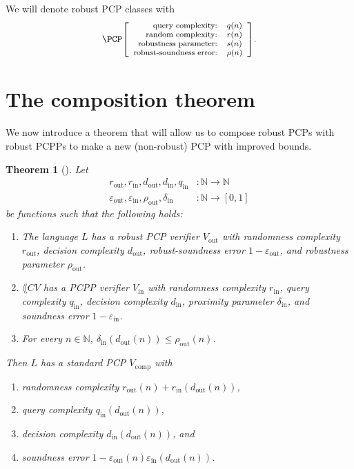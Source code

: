 \documentclass[english,12pt]{reedthesis}
\theoremstyle{plain}
\newtheorem{thm}{Theorem}[section]
\theoremstyle{definition}
\theoremstyle{remark}
\DeclareMathOperator{\out}{out}
\DeclareMathOperator{\oin}{in}
\newcommand{\pcpr}[4]{%
  \ensuremath%
  \mleft[{\footnotesize\begin{array}{r l}
    \text{query complexity:} & #1 \\
    \text{random complexity:} & #2 \\
    \text{robustness parameter:} & #3 \\
    \text{robust-soundness error:} & #4
  \end{array}}\mright]%
}
\begin{document}
We will denote robust PCP classes with
\[
  \PCP\pcpr{q(n)}{r(n)}{s(n)}{\rho(n)}.
\]

\section{The composition theorem}\label{sec:comp-theorem}

We now introduce a theorem that will allow us to compose robust PCPs with robust
PCPPs to make a new (non-robust) PCP with improved bounds.

\begin{thm}[{\cite[Theorem 2.7]{BGHSV06}}]\label{thm:composition}
  Let
  \begin{align*}
    r_{\out}, r_{\oin}, d_{\out}, d_{\oin}, q_{\oin}&: \mathbb{N} \rightarrow \mathbb{N} \\
    \varepsilon_{\out}, \varepsilon_{\oin}, \rho_{\out}, \delta_{\oin}&: \mathbb{N} \rightarrow [0, 1]
  \end{align*}
  be functions such that the following holds:
  \begin{enumerate}
    \item The language $L$ has a robust PCP verifier $V_{\out}$ with randomness
          complexity $r_{\out}$, decision complexity $d_{\out}$,
          robust-soundness error $1 - \varepsilon_{\out}$, and robustness parameter
          $\rho_{\out}$.
    \item $\lang{CV}$ has a PCPP verifier $V_{\oin}$ with randomness complexity
          $r_{\oin}$, query complexity $q_{\oin}$, decision complexity
          $d_{\oin}$, proximity parameter $\delta_{\oin}$, and soundness error
          $1 - \varepsilon_{\oin}$.
    \item For every $n \in \mathbb{N}$, $\delta_{\oin}(d_{\out}(n)) \le \rho_{\out}(n)$.
  \end{enumerate}
  Then $L$ has a standard PCP $V_{\operatorname{comp}}$ with
  \begin{enumerate}[label=\alph*.]
    \item randomness complexity $r_{\out}(n) + r_{\oin}(d_{\out}(n))$,
    \item query complexity $q_{\oin}(d_{\out}(n))$,
    \item decision complexity $d_{\oin}(d_{\out}(n))$, and
    \item soundness error $1 - \varepsilon_{\out}(n)\varepsilon_{\oin}(d_{\out}(n))$.
  \end{enumerate}
\end{thm}
\end{document}
